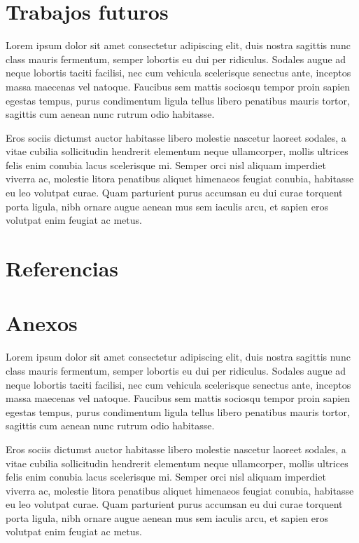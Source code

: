 \documentclass{article}
\begin{document}
\newpage

\section{Trabajos futuros}
Lorem ipsum dolor sit amet consectetur adipiscing elit, duis nostra sagittis nunc class mauris fermentum, semper lobortis eu dui per ridiculus. Sodales augue ad neque lobortis taciti facilisi, nec cum vehicula scelerisque senectus ante, inceptos massa maecenas vel natoque. Faucibus sem mattis sociosqu tempor proin sapien egestas tempus, purus condimentum ligula tellus libero penatibus mauris tortor, sagittis cum aenean nunc rutrum odio habitasse.

Eros sociis dictumst auctor habitasse libero molestie nascetur laoreet sodales, a vitae cubilia sollicitudin hendrerit elementum neque ullamcorper, mollis ultrices felis enim conubia lacus scelerisque mi. Semper orci nisl aliquam imperdiet viverra ac, molestie litora penatibus aliquet himenaeos feugiat conubia, habitasse eu leo volutpat curae. Quam parturient purus accumsan eu dui curae torquent porta ligula, nibh ornare augue aenean mus sem iaculis arcu, et sapien eros volutpat enim feugiat ac metus.
\newpage

\section{Referencias}
\cite{3blue1brown}
\printbibliography

\newpage

\section{Anexos}
Lorem ipsum dolor sit amet consectetur adipiscing elit, duis nostra sagittis nunc class mauris fermentum, semper lobortis eu dui per ridiculus. Sodales augue ad neque lobortis taciti facilisi, nec cum vehicula scelerisque senectus ante, inceptos massa maecenas vel natoque. Faucibus sem mattis sociosqu tempor proin sapien egestas tempus, purus condimentum ligula tellus libero penatibus mauris tortor, sagittis cum aenean nunc rutrum odio habitasse.

Eros sociis dictumst auctor habitasse libero molestie nascetur laoreet sodales, a vitae cubilia sollicitudin hendrerit elementum neque ullamcorper, mollis ultrices felis enim conubia lacus scelerisque mi. Semper orci nisl aliquam imperdiet viverra ac, molestie litora penatibus aliquet himenaeos feugiat conubia, habitasse eu leo volutpat curae. Quam parturient purus accumsan eu dui curae torquent porta ligula, nibh ornare augue aenean mus sem iaculis arcu, et sapien eros volutpat enim feugiat ac metus.
\end{document}
